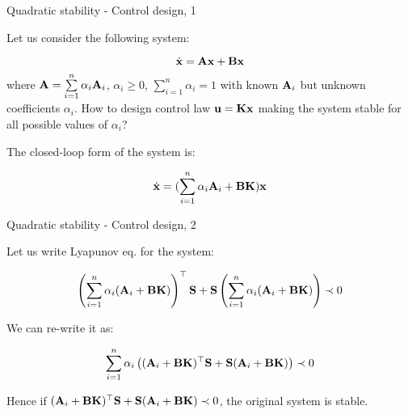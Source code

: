 \documentclass{beamer}
\begin{document}
	
	\begin{frame}{Quadratic stability - Control design, 1}
		\begin{flushleft}
			
			Let us consider the following system:
			
			\begin{equation}
				\dot{\mathbf{x}} = \mathbf{A}\mathbf{x} + \mathbf{B}\mathbf{x}
			\end{equation}
			where $\mathbf{A} = \sum\limits_{i=1}^{n} \alpha_i \mathbf{A}_i$, $\alpha_i \geq 0$, $\sum\limits_{i=1}^{n} \alpha_i = 1$ with known $\mathbf{A}_i$ but unknown coefficients $\alpha_i$. How to design control law $\mathbf{u} = \mathbf{K}\mathbf{x}$ making the system stable for all possible values of $\alpha_i$? 
			
			\bigskip
			
			The closed-loop form of the system is:
			
			\begin{equation}
				\dot{\mathbf{x}} = (\sum\limits_{i=1}^{n} \alpha_i \mathbf{A}_i + \mathbf{B}\mathbf{K})\mathbf{x}
			\end{equation}
			
			
		\end{flushleft}
	\end{frame}
	
	
	
	\begin{frame}{Quadratic stability - Control design, 2}
		\begin{flushleft}
			
			Let us write Lyapunov eq. for the system:
			
			\begin{equation}
				\left(
				\sum\limits_{i=1}^{n} \alpha_i (\mathbf{A}_i + \mathbf{B}\mathbf{K})
				\right)^\top \mathbf{S} 
				+ 
				\mathbf{S}
				\left(
				\sum\limits_{i=1}^{n} \alpha_i (\mathbf{A}_i + \mathbf{B}\mathbf{K})
				\right) 
				\prec 0
			\end{equation}
			
			We can re-write it as:
			
			\begin{equation}
				\sum\limits_{i=1}^{n} \alpha_i 
				\left( 
				(\mathbf{A}_i + \mathbf{B}\mathbf{K})^\top \mathbf{S} +
				\mathbf{S} (\mathbf{A}_i + \mathbf{B}\mathbf{K})
				\right)
				\prec 0
			\end{equation}
			
			Hence if $(\mathbf{A}_i + \mathbf{B}\mathbf{K})^\top \mathbf{S} +
			\mathbf{S} (\mathbf{A}_i + \mathbf{B}\mathbf{K}) \prec 0$, the original system is stable.
			
		\end{flushleft}
	\end{frame}
	
\end{document}
